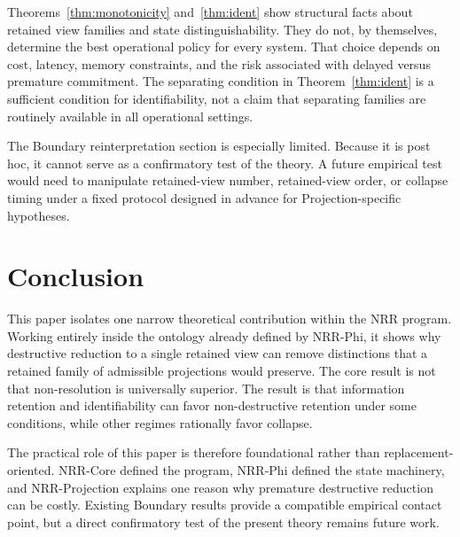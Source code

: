 \documentclass[11pt,a4paper]{article}
\begin{document}
Theorems~\ref{thm:monotonicity} and~\ref{thm:ident} show structural facts about retained view families and state distinguishability. They do not, by themselves, determine the best operational policy for every system. That choice depends on cost, latency, memory constraints, and the risk associated with delayed versus premature commitment.
The separating condition in Theorem~\ref{thm:ident} is a sufficient condition for identifiability, not a claim that separating families are routinely available in all operational settings.

The Boundary reinterpretation section is especially limited. Because it is post hoc, it cannot serve as a confirmatory test of the theory. A future empirical test would need to manipulate retained-view number, retained-view order, or collapse timing under a fixed protocol designed in advance for Projection-specific hypotheses.

\section{Conclusion}
\label{sec:conclusion}

This paper isolates one narrow theoretical contribution within the NRR program. Working entirely inside the ontology already defined by NRR-Phi, it shows why destructive reduction to a single retained view can remove distinctions that a retained family of admissible projections would preserve. The core result is not that non-resolution is universally superior. The result is that information retention and identifiability can favor non-destructive retention under some conditions, while other regimes rationally favor collapse.

The practical role of this paper is therefore foundational rather than replacement-oriented. NRR-Core defined the program, NRR-Phi defined the state machinery, and NRR-Projection explains one reason why premature destructive reduction can be costly. Existing Boundary results provide a compatible empirical contact point, but a direct confirmatory test of the present theory remains future work.
\end{document}

